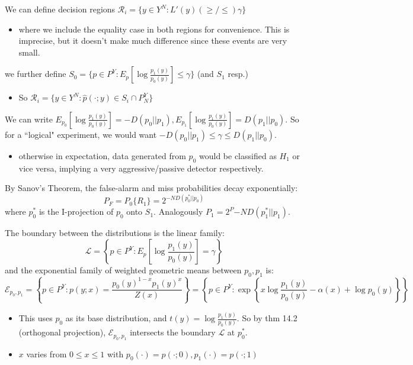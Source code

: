 \documentclass[12pt]{article} %
\begin{document}
We can define decision regions $\mathcal{R}_i = \{y \in Y^N : L'(y) (\geq/\leq) \gamma\}$ 
\begin{itemize}[topsep=-1pt, itemsep=-1pt]
    \item 
where we include the equality case in both regions for convenience. This is imprecise, but it doesn't make much difference since these events are very small.
\end{itemize}
we further define $S_0 = \{p \in P^Y: E_p[\log \frac{p_1(y)}{p_0(y)}] \leq \gamma\}$ (and $S_1$ resp.)
\begin{itemize}[topsep=-1pt, itemsep=-1pt]
    \item 
So $\mathcal{R}_i = \{y \in Y^N: \hat{p}(\cdot; y) \in S_i \cap P_N^Y\}$
\end{itemize}
We can write $E_{p_0}[\log \frac{p_1(y)}{p_0(y)}] = - D(p_0 || p_1), E_{p_1}[\log \frac{p_1(y)}{p_0(y)}] = D(p_1 || p_0)$. So for a ``logical" experiment, we would want $- D(p_0 || p_1) \leq \gamma \leq D(p_1 || p_0)$.
\begin{itemize}[topsep=-1pt, itemsep=-1pt]
    \item 
otherwise in expectation, data generated from $p_0$ would be classified as $H_1$ or vice versa, implying a very aggressive/passive detector respectively.
\end{itemize}

By Sanov's Theorem, the false-alarm and miss probabilities decay exponentially:
\begin{equation*}
    P_F = P_0\{R_1\} = 2^{-ND(p_0^* || p_0)}
\end{equation*}
where $p_0^*$ is the I-projection of $p_0$ onto $S_1$. Analogously $P_1 = 2^P{-ND(p_1^* || p_1)}$.

The boundary between the distributions is the linear family:
\begin{equation*}
    \mathcal{L} =
    \left\{
    p \in P^Y :
    E_p\left[\log \frac{p_1(y)}{p_0(y)}\right] = \gamma
    \right\}
\end{equation*}
and the exponential family of weighted geometric means between $p_0, p_1$ is:
\begin{equation*}
    \mathcal{E}_{p_0, p_1}
    =
    \left\{
    p \in P^Y
    :
    p(y;x) = \frac{p_0(y)^{1-x}p_1(y)^x}{Z(x)}
    \right\}
    =
    \left \{
    p \in P^Y :
    \exp
    \left\{
    x \log \frac{p_1(y)}{p_0(y)}
    - \alpha(x) + \log p_0(y)
    \right\}
    \right \}
\end{equation*}
\begin{itemize}[topsep=-1pt, itemsep=-1pt]
    \item 
This uses $p_0$ as its base distribution, and $t(y) = \log \frac{p_1(y)}{p_0(y)}$. So by thm 14.2 (orthogonal projection), $\mathcal{E}_{p_0,p_1}$ intersects the boundary $\mathcal{L}$ at $p_0^*$.
    \item 
$x$ varies from $0 \leq x \leq 1$ with $p_0(\cdot) = p(\cdot; 0), p_1(\cdot) = p(\cdot;1)$
\end{itemize}
\end{document}
